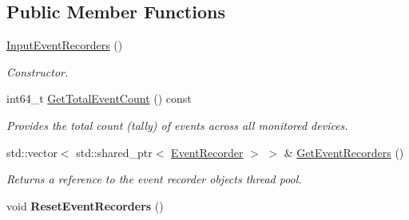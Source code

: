 \subsection*{Public Member Functions}
\begin{DoxyCompactItemize}
\item 
\mbox{\label{classEventDetect_1_1InputEventRecorders_a4570384c57a5e72fbd3a78056f8093e8}} 
\mbox{\hyperlink{classEventDetect_1_1InputEventRecorders_a4570384c57a5e72fbd3a78056f8093e8}{Input\+Event\+Recorders}} ()
\begin{DoxyCompactList}\small\item\em Constructor. \end{DoxyCompactList}\item 
int64\+\_\+t \mbox{\hyperlink{classEventDetect_1_1InputEventRecorders_aafd4194710ca37dee2cb8bd4cc5e50b0}{Get\+Total\+Event\+Count}} () const
\begin{DoxyCompactList}\small\item\em Provides the total count (tally) of events across all monitored devices. \end{DoxyCompactList}\item 
std\+::vector$<$ std\+::shared\+\_\+ptr$<$ \mbox{\hyperlink{classEventDetect_1_1InputEventRecorders_1_1EventRecorder}{Event\+Recorder}} $>$ $>$ \& \mbox{\hyperlink{classEventDetect_1_1InputEventRecorders_a33322b5f96196ac7cad264428d04aeda}{Get\+Event\+Recorders}} ()
\begin{DoxyCompactList}\small\item\em Returns a reference to the event recorder objects thread pool. \end{DoxyCompactList}\item 
\mbox{\label{classEventDetect_1_1InputEventRecorders_addb90d9c055cb870ea212f9e6ad9565f}} 
void {\bfseries Reset\+Event\+Recorders} ()
\end{DoxyCompactItemize}
